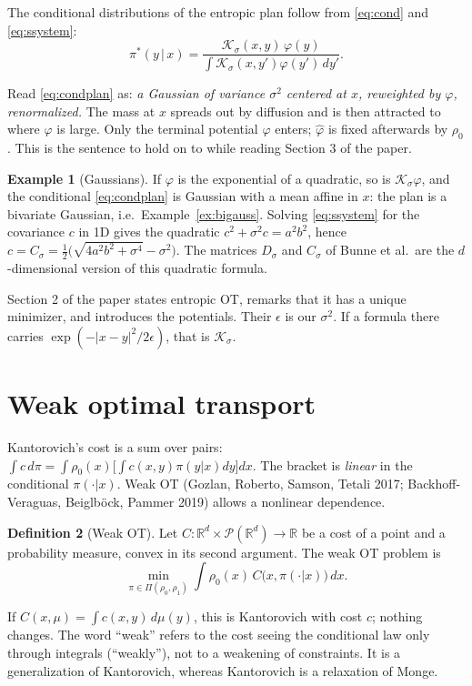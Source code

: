 \documentclass[11pt]{article}
\newcommand{\R}{\mathbb{R}}
\newcommand{\Pc}{\mathcal{P}}
\newcommand{\Kc}{\mathcal{K}}
\newcommand{\hphi}{\hat\varphi}
\theoremstyle{definition}
\newtheorem{definition}{Definition}[section]
\newtheorem{example}[definition]{Example}
\theoremstyle{plain}
\begin{document}
The conditional distributions of the entropic plan follow from \eqref{eq:cond} and \eqref{eq:ssystem}:
\begin{equation}
  \label{eq:condplan}
  \pi^*(y\,|\,x)=\frac{\Kc_\sigma(x,y)\,\varphi(y)}{\int\Kc_\sigma(x,y')\varphi(y')\,dy'} .
\end{equation}
\begin{keybox}
Read \eqref{eq:condplan} as: \emph{a Gaussian of variance $\sigma^2$ centered at $x$, reweighted by
$\varphi$, renormalized.} The mass at $x$ spreads out by diffusion and is then attracted to
where $\varphi$ is large. Only the terminal potential $\varphi$ enters; $\hphi$ is fixed
afterwards by $\rho_0$. This is the sentence to hold on to while reading Section 3 of the paper.
\end{keybox}

\begin{example}[Gaussians]
If $\varphi$ is the exponential of a quadratic, so is $\Kc_\sigma\varphi$, and the
conditional \eqref{eq:condplan} is Gaussian with a mean affine in $x$: the plan is a bivariate
Gaussian, i.e.\ Example~\ref{ex:bigauss}. Solving \eqref{eq:ssystem} for the covariance $c$
in 1D gives the quadratic $c^2+\sigma^2c=a^2b^2$, hence
$c=C_\sigma=\tfrac12\big(\sqrt{4a^2b^2+\sigma^4}-\sigma^2\big)$. The matrices $D_\sigma$ and
$C_\sigma$ of Bunne et al.\ are the $d$-dimensional version of this quadratic formula.
\end{example}

\begin{readbox}
Section 2 of the paper states entropic OT, remarks that it has a unique minimizer, and
introduces the potentials. Their $\epsilon$ is our $\sigma^2$. If a formula there carries
$\exp(-|x-y|^2/2\epsilon)$, that is $\Kc_\sigma$.
\end{readbox}

\section{Weak optimal transport}
\label{sec:weak}

Kantorovich's cost is a sum over pairs: $\int c\,d\pi=\int\rho_0(x)\big[\int c(x,y)\pi(y|x)dy\big]dx$.
The bracket is \emph{linear} in the conditional $\pi(\cdot|x)$. Weak OT (Gozlan, Roberto,
Samson, Tetali 2017; Backhoff-Veraguas, Beiglb\"ock, Pammer 2019) allows a nonlinear
dependence.

\begin{definition}[Weak OT]
Let $C:\R^d\times\Pc(\R^d)\to\R$ be a cost of a point and a probability measure, convex in
its second argument. The weak OT problem is
\begin{equation}
  \label{eq:weak}
  \min_{\pi\in\Pi(\rho_0,\rho_1)}\int\rho_0(x)\,C\big(x,\pi(\cdot|x)\big)\,dx .
\end{equation}
\end{definition}
If $C(x,\mu)=\int c(x,y)\,d\mu(y)$, this is Kantorovich with cost $c$; nothing changes.
The word ``weak'' refers to the cost seeing the conditional law only through integrals
(``weakly''), not to a weakening of constraints. It is a generalization of Kantorovich,
whereas Kantorovich is a relaxation of Monge.
\end{document}
